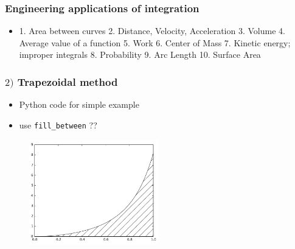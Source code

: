 \documentclass[english,14pt]{beamer}
\begin{document}

\begin{frame}[fragile]

\frametitle{Engineering applications of integration}


\begin{itemize}
	\item 1. Area between curves
2. Distance, Velocity, Acceleration
3. Volume
4. Average value of a function
5. Work
6. Center of Mass
7. Kinetic energy; improper integrals
8. Probability
9. Arc Length
10. Surface Area
\end{itemize}

\end{frame}


\begin{frame}[fragile]

\frametitle{$2)$ Trapezoidal method}

\begin{itemize}
	\item Python code for simple example
	\item use \texttt{fill\_between} ??
\end{itemize}

\begin{figure}[ht]
	\centering
	\includegraphics[width=0.5\textwidth]{figures/LLp134}
\end{figure}

\end{frame}

%
%
%
%
%
\end{document}

